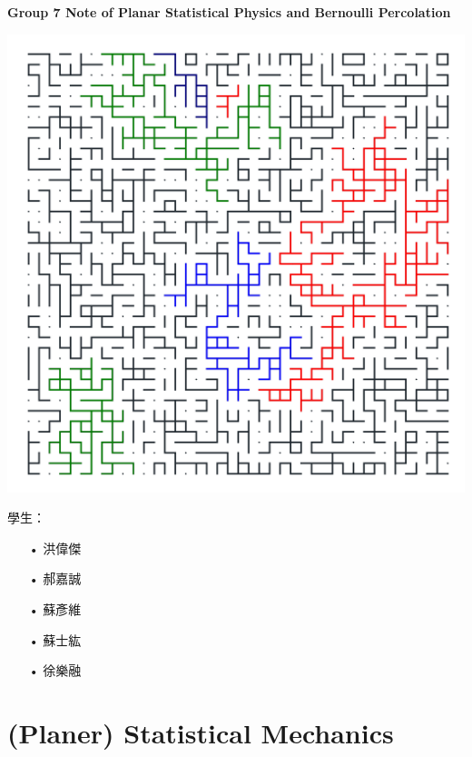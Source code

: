 \documentclass[12pt,a4paper]{report}
\theoremstyle{definition}
\begin{document}
\begin{center}
\Huge    \textbf{Group 7 Note of Planar Statistical Physics and Bernoulli Percolation}
\end{center}
\begin{center}
\includegraphics[width=15cm]{./picture/p=0.45.png}
\end{center}
\vspace{2cm}
\begin{flushleft}
    \begin{CJK}{UTF8}{bkai}
    學生：
    \begin{enumerate}
        \item[•] 洪偉傑
        \item[•] 郝嘉誠
        \item[•] 蘇彥維
        \item[•] 蘇士紘
        \item[•] 徐樂融
    \end{enumerate}
    \end{CJK}
\end{flushleft}
\setcounter{chapter}{-1}
\chapter{(Planer) Statistical Mechanics}
\end{document}
